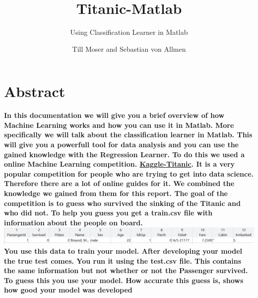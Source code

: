 \documentclass[
   10.5pt,
   invert-title=true,
   titlepage=false,
   titleimage-ratio=13,
   class=article
]{bfhpub}				%
\begin{document}
\setlength{\parskip}{0pt}
\setlength{\parindent}{0pt}
  \title{Titanic-Matlab}
  \subtitle{Using Classification Learner in Matlab}
  \author{Till Moser and Sebastian von Allmen}
  \subject{BZG1308ab}
  
  \maketitle

\section*{Abstract}
\textbf{In this documentation we will give you a brief overview of how Machine Learning works and how you can use it in Matlab. More specifically we will talk about the classification learner in Matlab. This will give you a powerfull tool for data analysis and you can use the gained knowledge with the Regression Learner.\newline
To do this we used a online Machine Learning competition. \href{https://www.kaggle.com/c/titanic}{Kaggle-Titanic}. It is a very popular competition for people who are trying to get into data science. Therefore there are a lot of online guides for it. We combined the knowledge we gained from them for this report. The goal of the competition is to guess who survived the sinking of the Titanic and who did not. To help you guess you get a train.csv file with information about the people on board. 
\includegraphics[width=155mm\\]{data} 
\newline
You use this data to train your model. After developing your model the true test comes. You run it using the test.csv file. This contains the same information but not whether or not the Passenger survived. To guess this you use your model. How accurate this guess is, shows how good your model was developed}
\end{document}
